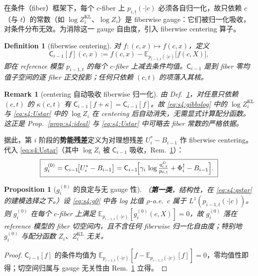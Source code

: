 \documentclass[11pt,a4paper]{article}
\newtheorem{proposition}[theorem]{Proposition}
\newtheorem{definition}[theorem]{Definition}
\newtheorem{remark}[theorem]{Remark}
\newcommand{\E}{\mathbb{E}}
\newcommand{\Center}{\mathsf{C}}    %
\begin{document}
在条件（fiber）框架下，每个 $c$-fiber 上 $p_{i,t}(\cdot|c)$ 必须各自归一化，故只依赖 $c$（与 $t$）的常数（如 $\log Z_i^{\mathrm{KL}}$、$\log Z_i$）是 fiberwise gauge：它们被归一化吸收，对条件分布无效。为消除这一 gauge 自由度，引入 fiberwise centering 算子。

\begin{definition}[fiberwise centering]\label{def:s4:center}
对 $f:(c,x)\mapsto f(c,x)$，定义
\begin{equation}\label{eq:s4:center}
\Center_{i-1}[f](c,x):=f(c,x)-\E_{p_{i-1,t}(\cdot|c)}\!\bigl[f(c,X)\bigr],
\end{equation}
即在 reference 模型 $p_{i-1,t}$ 的每个 $c$-fiber 上减去条件均值。$\Center_{i-1}$ 是到 fiber 零均值子空间的逐 fiber 正交投影；任何只依赖 $(c,t)$ 的项落入其核。
\end{definition}

\begin{remark}[centering 自动吸收 fiberwise 归一化]\label{rem:s4:absorb}
由 Def.~\ref{def:s4:center}，对任意只依赖 $(c,t)$ 的 $\kappa(c,t)$ 有 $\Center_{i-1}[f+\kappa]=\Center_{i-1}[f]$。故 \eqref{eq:s4:gibbslog} 中的 $\log Z_i^{\mathrm{KL}}$ 与 \eqref{eq:s4:Ustar} 中的 $\log Z_i$ 在 centering 后\emph{自动消失}，无需显式计算配分函数。这正是 Prop.~\ref{prop:s4:ideal} 与 \eqref{eq:s4:Ustar} 中可略去 fiber 常数的严格依据。
\end{remark}

据此，第 $i$ 阶段的\textbf{势能残差}定义为对理想残差 $U_i^*-B_{i-1}$ 作 fiberwise centering。代入 \eqref{eq:s4:Ustar}（其中 $\log Z_i$ 被 $\Center_{i-1}$ 吸收，Rem.~\ref{rem:s4:absorb}）：
\begin{equation}\label{eq:s4:g0}
\boxed{\;
g_i^{(0)}=\Center_{i-1}\!\bigl[U_i^*-B_{i-1}\bigr]
=\Center_{i-1}\!\Bigl[\gamma_i\,\log\tfrac{q_{i,t}^D}{p_{0,t}}+\Phi_i^\dagger-B_{i-1}\Bigr].
\;}
\end{equation}

\begin{proposition}[$g_i^{(0)}$ 的良定与无 gauge 性]\label{prop:s4:g0}
（\textbf{第一类}，结构性，在 \eqref{eq:s4:qstar} 的建模选择之下。）设 \eqref{eq:s4:g0} 中各 log 比值 $\rho$-a.e.\ $c$ 属于 $L^1(p_{i-1,t}(\cdot|c))$。则 $g_i^{(0)}$ 在每个 $c$-fiber 上满足 $\E_{p_{i-1,t}(\cdot|c)}[g_i^{(0)}(c,X)]=0$，故 $g_i^{(0)}$ 落在 reference 模型的 fiber 切空间内，且不含任何 fiberwise 归一化自由度；特别地 $g_i^{(0)}$ 与配分函数 $Z_i$、$Z_i^{\mathrm{KL}}$ 无关。
\end{proposition}

\begin{proof}
$\Center_{i-1}[f]$ 的条件均值为 $\E_{p_{i-1,t}(\cdot|c)}[f-\E_{p_{i-1,t}(\cdot|c)}[f]]=0$，零均值性即得；切空间归属与 gauge 无关性由 Rem.~\ref{rem:s4:absorb} 立得。
\end{proof}
\end{document}
